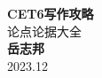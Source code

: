 \begin{titlepage}
    \begin{center}
    {\fontsize{40}{48}\selectfont \bfseries CET6写作攻略} 
    \\\vspace{20pt}
    {\LARGE 论点论据大全} \\
    \vspace{20pt}
    \textbf{岳志邦}
    \vspace{8pt}
    \\ 2023.12
    \end{center}
\end{titlepage}